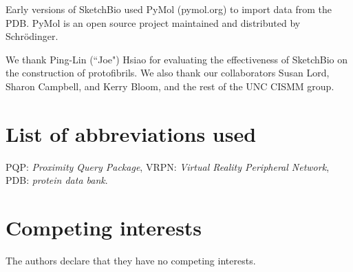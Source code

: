 \documentclass[twocolumn]{bmcart}%
\begin{document}
Early versions of SketchBio used PyMol (pymol.org) to import data from the PDB.
PyMol is an open source project maintained and distributed by Schrödinger.

We thank Ping-Lin (``Joe") Hsiao for evaluating the effectiveness of SketchBio on the construction of protofibrils. We also thank our collaborators Susan Lord, Sharon Campbell, and Kerry Bloom, and the rest of the UNC CISMM group.


\begin{backmatter}

\section*{List of abbreviations used}
PQP: \textit{Proximity Query Package}, VRPN: \textit{Virtual Reality Peripheral Network}, PDB: \textit{protein data bank}.

\section*{Competing interests}
The authors declare that they have no competing interests.





\end{backmatter}
\end{document}
